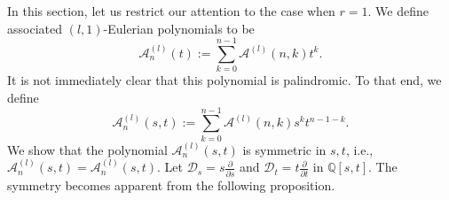 \documentclass{article}
\newcommand{\dd}{\mathcal{D}}
\newcommand{\eul}{\mathcal{A}}
\newtheorem{proposition}[theorem]{Proposition}
\theoremstyle{definition}
\numberwithin{equation}{section}
\begin{document}


In this section, let us restrict our attention to the case when $r=1$.
We define associated $(l,1)$-Eulerian polynomials to be
\begin{equation}
    \eul_n^{(l)}(t):=\sum_{k=0}^{n-1} \eul^{(l)}(n,k)t^k.
\end{equation}
It is not immediately clear that this polynomial is palindromic. To that end, we define \begin{equation}\label{eq: r=1 eul}
     \eul_n^{(l)}(s,t):= \displaystyle \sum_{k=0}^{n-1} \eul^{(l)}(n,k)s^kt^{n-1-k}.
\end{equation} 
We show that the polynomial $\eul_n^{(l)}(s,t)$ is symmetric in $s,t$, i.e.,
$\eul_n^{(l)}(s,t)=\eul_n^{(l)}(s,t)$. Let $\dd_s=s\frac{\partial }{\partial s}$ and $\dd_t=t\frac{\partial }{\partial t}$ in $\mathbb Q[s,t]$.
The symmetry becomes apparent from the following proposition.
\end{document}
